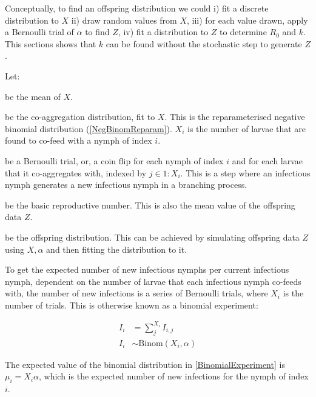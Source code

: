 \documentclass{article}
\begin{document}
Conceptually, to find an offspring distribution we could i) fit a discrete distribution to $ X $ ii) draw random values from $ X $, iii) for each value drawn, apply a Bernoulli trial of $ \alpha $ to find $ Z $, iv) fit a distribution to $ Z $ to determine $ R_0 $ and $ k $. This sections shows that $ k $ can be found without the stochastic step to generate $ Z $. 

Let:

\begin{description}[leftmargin=1cm, style=nextline]
	\item[$ m = \frac{1}{n} \sum_i^n L_i $] be the mean of $ X $.
	\item[$ X \sim \text{NB}(m, k) $] be the co-aggregation distribution, fit to $ X $. This is the reparameterised negative binomial distribution (\ref{NegBinomReparam}).
	$ X_i $ is the number of larvae that are found to co-feed with a nymph of index $ i $.
	\item[$ I_{i,j} \sim \text{Bern}(p=\alpha) $] be a Bernoulli trial, or, a coin flip for each nymph of index $ i $ and for each larvae that it co-aggregates with, indexed by $ j \in 1:X_i $. This is a step where an infectious nymph generates a new infectious nymph in a branching process.
	\item[$ R_0 $] be the basic reproductive number. This is also the mean value of the offspring data $ Z $.
	\item[$ Z \sim \text{NB}(R_0, k) $] be the offspring distribution. This can be achieved by  simulating offspring data $ Z $ using $ X, \alpha $ and then fitting the distribution to it.
\end{description}

To get the expected number of new infectious nymphs per current infectious nymph, dependent on the number of larvae that each infectious nymph co-feeds with, the number of new infections is a series of Bernoulli trials, where $ X_i $ is the number of trials. This is otherwise known as a binomial experiment:

\begin{align}
    I_i &= \sum_j^{X_i} I_{i,j} \nonumber \\
    I_i &\sim \text{Binom}(X_i,\alpha)\label{BinomialExperiment}
\end{align}

The expected value of the binomial distribution in \eqref{BinomialExperiment} is $ \mu_i = X_i \alpha $, which is the expected number of new infections for the nymph of index $ i $.
\end{document}
